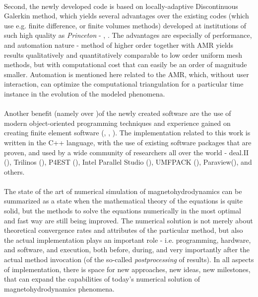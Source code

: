 \paragraph{}
Second, the newly developed code is based on locally-adaptive Discontinuous Galerkin method, which yields several advantages over the existing codes (which use e.g. finite difference, or finite volumes methods) developed at institutions of such high quality as \emph{Princeton} - \citep{athena}, \citep{zeus}. The advantages are especially of performance, and automation nature - method of higher order together with AMR yields results qualitatively and quantitatively comparable to low order uniform mesh methods, but with computational cost that can easily be an order of magnitude smaller. Automation is mentioned here related to the AMR, which, without user interaction, can optimize the computational triangulation for a particular time instance in the evolution of the modeled phenomena.
\paragraph{}
Another benefit (namely over \citep{zeus})of the newly created software are the use of modern object-oriented programming techniques and experience gained on creating finite element software (\citep{ja1}, \citep{ja2}, \citep{ja3}).
The implementation related to this work is written in the C++ language, with the use of existing software packages that are proven, and used by a wide community of researchers all over the world - deal.II (\citep{deal}), Trilinos (\cite{trilinos}), P4EST (\cite{p4est}), Intel Parallel Studio (\cite{intel}), UMFPACK (\citep{umfpack}), Paraview(\cite{paraview}), and others.

\paragraph{}
The state of the art of numerical simulation of magnetohydrodynamics can be summarized as a state when the mathematical theory of the equations is quite solid, but the methods to solve the equations numerically in the most optimal and fast way are still being improved. The numerical solution is not merely about theoretical convergence rates and attributes of the particular method, but also the actual implementation plays an important role - i.e. programming, hardware, and software, and execution, both before, during, and very importantly after the actual method invocation (of the so-called \textit{postprocessing} of results). In all aspects of implementation, there is space for new approaches, new ideas, new milestones, that can expand the capabilities of today's numerical solution of magnetohydrodynamics phenomena.